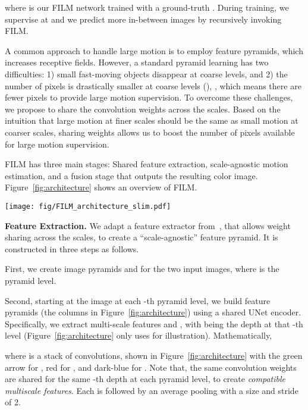 \documentclass[runningheads]{llncs}
\begin{document}
where  is our FILM network trained with a ground-truth . During training, we supervise at  and we predict more in-between images by recursively invoking FILM.


A common approach to handle large motion is to employ feature pyramids, which increases receptive fields. However, a standard pyramid learning has two difficulties: 1) small fast-moving objects disappear at coarse levels, and 2) the number of pixels is drastically smaller at coarse levels (), , which means there are fewer pixels to provide large motion supervision. To overcome these challenges, we propose to share the convolution weights across the scales. Based on the intuition that large motion at finer scales should be the same as small motion at coarser scales, sharing weights allows us to boost the number of pixels available for large motion supervision.


FILM has three main stages: Shared feature extraction, scale-agnostic motion estimation, and a fusion stage that outputs the resulting color image. Figure~\ref{fig:architecture} shows an overview of FILM.
\begin{figure*}[t!]
    \centering
    \texttt{[image: fig/FILM\_architecture\_slim.pdf]}
    \caption{FILM architecture. Our flow estimation module computes ``scale agnostic'' bi-directional flows based on the feature pyramids, extracted by shared weights.}
    \label{fig:architecture}
    \vspace{-4ex}
\end{figure*}

\vspace{0.05in}
\noindent\textbf{Feature Extraction.} We adapt a feature extractor from~\cite{fusion-2019}, that allows weight sharing across the scales, to create a ``scale-agnostic'' feature pyramid. It is constructed in three steps as follows.
 
First, we create image pyramids  and  for the two input images, where  is the pyramid level. 

Second, starting at the image at each -th pyramid level, we build feature pyramids (the columns in Figure~\ref{fig:architecture}) using a shared UNet encoder. Specifically, we extract multi-scale features  and , with  being the depth at that -th level (Figure~\ref{fig:architecture} only uses  for illustration). Mathematically,

where  is a stack of convolutions, shown in Figure~\ref{fig:architecture} with the green arrow for , red for , and dark-blue for . Note that, the same  convolution weights are shared for the same -th depth at each pyramid level, to create {\em compatible multi\-scale features}. Each  is followed by an average pooling with a size and stride of 2.
\end{document}
